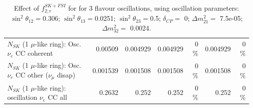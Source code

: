 \begin{table}
\begin{tabular}{| l | r | r | r  r | r  r |}
                          $N_{SK}$ (1 $\mu$-like ring): Osc. $\nu_e$ CC coherent &         0.00509 &        0.004929 &        0.004929 &        0 \%  &        0.004929 &        0 \%  \\ 
           $N_{SK}$ (1 $\mu$-like ring): Osc. $\nu_e$ CC other ($\nu_\mu$ disap) &        0.001539 &        0.001508 &        0.001508 &        0 \%  &        0.001508 &        0 \%  \\ 
                        $N_{SK}$ (1 $\mu$-like ring): oscillation $\nu_e$ CC all &          0.2632 &           0.252 &           0.252 &        0 \%  &           0.252 &        0 \%  \\ 
\hline
\hline
\end{tabular}
\caption{ Effect of $f_{2; r}^{SK+FSI}$ for for 3 flavour oscillations, using oscillation parameters:  $\sin^2\theta_{12} = $0.306; $\sin^2\theta_{13} = $0.0251; $\sin^2\theta_{23} = $0.5; $\delta_{CP} = $        0; $\Delta m^2_{21} = $    7.5e-05; $\Delta m^2_{32} = $    0.0024. }
\label{tab:num_skdetfsi_002_1RmuT_3f_osc_t13:0.0251_spectralreco_spectraltrue}
\end{table}
\clearpage
